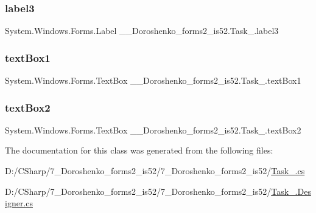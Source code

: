 \subsubsection{\texorpdfstring{label3}{label3}}
{\footnotesize\ttfamily System.\+Windows.\+Forms.\+Label \+\_\+\_\+\+Doroshenko\+\_\+forms2\+\_\+is52.\+Task\+\_.\+label3\hspace{0.3cm}{\ttfamily [private]}}

\hypertarget{class__7___doroshenko__forms2__is52_1_1_task__9_a4aa140b1ba89e675c011f4be366e21ca}{}\label{class__7___doroshenko__forms2__is52_1_1_task__9_a4aa140b1ba89e675c011f4be366e21ca} 
\subsubsection{\texorpdfstring{text\+Box1}{textBox1}}
{\footnotesize\ttfamily System.\+Windows.\+Forms.\+Text\+Box \+\_\+\_\+\+Doroshenko\+\_\+forms2\+\_\+is52.\+Task\+\_.\+text\+Box1\hspace{0.3cm}{\ttfamily [private]}}

\hypertarget{class__7___doroshenko__forms2__is52_1_1_task__9_aca272bd2f655d99aaf77424638d7cf79}{}\label{class__7___doroshenko__forms2__is52_1_1_task__9_aca272bd2f655d99aaf77424638d7cf79} 
\subsubsection{\texorpdfstring{text\+Box2}{textBox2}}
{\footnotesize\ttfamily System.\+Windows.\+Forms.\+Text\+Box \+\_\+\_\+\+Doroshenko\+\_\+forms2\+\_\+is52.\+Task\+\_.\+text\+Box2\hspace{0.3cm}{\ttfamily [private]}}



The documentation for this class was generated from the following files\+:\begin{DoxyCompactItemize}
\item 
D\+:/\+C\+Sharp/7\+\_\+\+Doroshenko\+\_\+forms2\+\_\+is52/7\+\_\+\+Doroshenko\+\_\+forms2\+\_\+is52/\hyperlink{_task__9_8cs}{Task\+\_.\+cs}\item 
D\+:/\+C\+Sharp/7\+\_\+\+Doroshenko\+\_\+forms2\+\_\+is52/7\+\_\+\+Doroshenko\+\_\+forms2\+\_\+is52/\hyperlink{_task__9_8_designer_8cs}{Task\+\_.\+Designer.\+cs}\end{DoxyCompactItemize}
